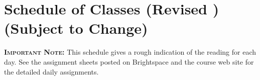 \documentclass[11pt,twoside]{jgsyllabus}\usepackage[]{graphicx}\usepackage[]{color}
\begin{document}
\cleardoublepage
\appendix
\setcounter{secnumdepth}{0}
\newcommand{\maybehline}{\hline}%
\setlength\extrarowheight{4pt}
\section[Class Schedule]{Schedule of Classes
\ifrevised
	(Revised \RevisionDate)%
\else
	(Subject to Change)%
\fi}

\textbf{\scshape Important Note:} This schedule gives a rough indication of the
reading for each day. See the assignment sheets posted on Brightspace
and the course web site for the detailed daily assignments.

\setlength{\aboverulesep}{0.2ex}
\setlength{\belowrulesep}{0.2ex}
\setlength{\extrarowheight}{0.1ex}
\setlength{\heavyrulewidth}{0.5pt}
\setlength{\lightrulewidth}{0.05pt}
\end{document}
